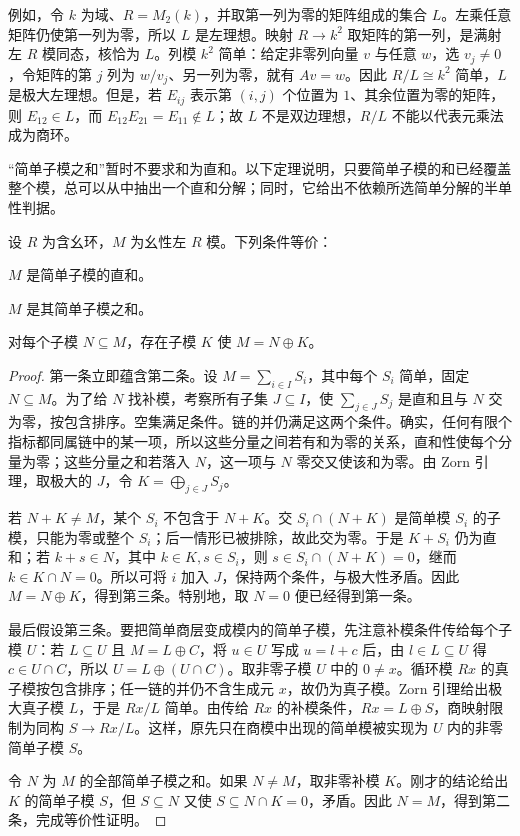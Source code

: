 \ProseParagraphBreak
例如，令 \(k\) 为域、\(R=M_2(k)\)，并取第一列为零的矩阵组成的集合 \(L\)。左乘任意矩阵仍使第一列为零，所以 \(L\) 是左理想。映射 \(R\to k^2\) 取矩阵的第一列，是满射左 \(R\) 模同态，核恰为 \(L\)。列模 \(k^2\) 简单：给定非零列向量 \(v\) 与任意 \(w\)，选 \(v_j\ne0\)，令矩阵的第 \(j\) 列为 \(w/v_j\)、另一列为零，就有 \(Av=w\)。因此 \(R/L\cong k^2\) 简单，\(L\) 是极大左理想。但是，若 \(E_{ij}\) 表示第 \((i,j)\) 个位置为 \(1\)、其余位置为零的矩阵，则 \(E_{12}\in L\)，而 \(E_{12}E_{21}=E_{11}\notin L\)；故 \(L\) 不是双边理想，\(R/L\) 不能以代表元乘法成为商环。

\ProseParagraphBreak
“简单子模之和”暂时不要求和为直和。以下定理说明，只要简单子模的和已经覆盖整个模，总可以从中抽出一个直和分解；同时，它给出不依赖所选简单分解的半单性判据。

\begin{theorem}[半单模的等价刻画]\label{b2:thm:semisimple-module-characterizations}
	设 \(R\) 为含幺环，\(M\) 为幺性左 \(R\) 模。下列条件等价：
	\begin{equivalences}
		\item \(M\) 是简单子模的直和。
		\item \(M\) 是其简单子模之和。
		\item 对每个子模 \(N\subseteq M\)，存在子模 \(K\) 使 \(M=N\oplus K\)。
	\end{equivalences}
\end{theorem}
\begin{proof}
	第一条立即蕴含第二条。设 \(M=\sum_{i\in I}S_i\)，其中每个 \(S_i\) 简单，固定 \(N\subseteq M\)。为了给 \(N\) 找补模，考察所有子集 \(J\subseteq I\)，使 \(\sum_{j\in J}S_j\) 是直和且与 \(N\) 交为零，按包含排序。空集满足条件。链的并仍满足这两个条件。确实，任何有限个指标都同属链中的某一项，所以这些分量之间若有和为零的关系，直和性使每个分量为零；这些分量之和若落入 \(N\)，这一项与 \(N\) 零交又使该和为零。由 Zorn 引理，取极大的 \(J\)，令 \(K=\bigoplus_{j\in J}S_j\)。

	若 \(N+K\ne M\)，某个 \(S_i\) 不包含于 \(N+K\)。交 \(S_i\cap(N+K)\) 是简单模 \(S_i\) 的子模，只能为零或整个 \(S_i\)；后一情形已被排除，故此交为零。于是 \(K+S_i\) 仍为直和；若 \(k+s\in N\)，其中 \(k\in K,s\in S_i\)，则 \(s\in S_i\cap(N+K)=0\)，继而 \(k\in K\cap N=0\)。所以可将 \(i\) 加入 \(J\)，保持两个条件，与极大性矛盾。因此 \(M=N\oplus K\)，得到第三条。特别地，取 \(N=0\) 便已经得到第一条。

	最后假设第三条。要把简单商层变成模内的简单子模，先注意补模条件传给每个子模 \(U\)：若 \(L\subseteq U\) 且 \(M=L\oplus C\)，将 \(u\in U\) 写成 \(u=l+c\) 后，由 \(l\in L\subseteq U\) 得 \(c\in U\cap C\)，所以 \(U=L\oplus(U\cap C)\)。取非零子模 \(U\) 中的 \(0\ne x\)。循环模 \(Rx\) 的真子模按包含排序；任一链的并仍不含生成元 \(x\)，故仍为真子模。Zorn 引理给出极大真子模 \(L\)，于是 \(Rx/L\) 简单。由传给 \(Rx\) 的补模条件，\(Rx=L\oplus S\)，商映射限制为同构 \(S\to Rx/L\)。这样，原先只在商模中出现的简单模被实现为 \(U\) 内的非零简单子模 \(S\)。

	令 \(N\) 为 \(M\) 的全部简单子模之和。如果 \(N\ne M\)，取非零补模 \(K\)。刚才的结论给出 \(K\) 的简单子模 \(S\)，但 \(S\subseteq N\) 又使 \(S\subseteq N\cap K=0\)，矛盾。因此 \(N=M\)，得到第二条，完成等价性证明。
\end{proof}

